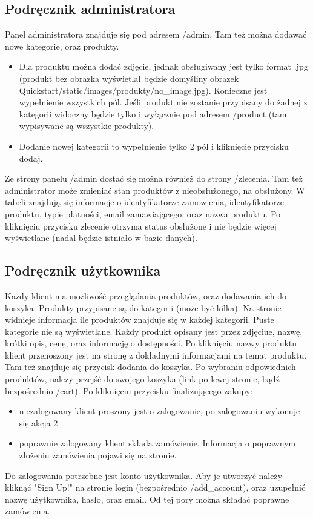 \documentclass[12pt]{article}
\begin{document}
  \subsection{Podręcznik administratora}
	Panel administratora znajduje się pod adresem /admin. Tam też można dodawać nowe kategorie, oraz produkty. 
	\begin {itemize}
		\item  Dla produktu można dodać zdjęcie, jednak obsługiwany jest tylko format .jpg (produkt bez obrazka wyświetlał będzie domyśliny obrazek Quickstart/static/images/produkty/no\_image.jpg). Konieczne jest wypełnienie wszystkich pól. Jeśli produkt nie zostanie przypisany do żadnej z kategorii widoczny będzie tylko i wyłącznie pod adresem /product (tam wypisywane są wszystkie produkty).
		\item Dodanie nowej kategorii to wypełnienie tylko 2 pól i kliknięcie przycisku dodaj.
	\end {itemize}
	Ze strony panelu /admin dostać się można również do strony /zlecenia. Tam też administrator może zmieniać stan produktów z nieobsłużonego, na obsłużony. W tabeli znajdują się informacje o identyfikatorze zamowienia, identyfikatorze produktu, typie płatności, email zamawiającego, oraz nazwa produktu. Po kliknięciu przycisku zlecenie otrzyma status obsłużone i nie będzie więcej wyświetlane (nadal będzie istniało w bazie danych).
  \subsection {Podręcznik użytkownika}
	Każdy klient ma możliwość przeglądania produktów, oraz dodawania ich do koszyka. Produkty przypisane są do kategorii (może być kilka). Na stronie widnieje informacja ile produktów znajduje się w każdej kategorii. Puste kategorie nie są wyświetlane. Każdy produkt opisany jest przez zdjęciue, nazwę, krótki opis, cenę, oraz informację o dostępności. Po kliknięciu nazwy produktu klient przenoszony jest na stronę z dokładnymi informacjami na temat produktu. Tam też znajduje się przycisk dodania do koszyka.
Po wybraniu odpowiednich produktów, należy przejść do swojego koszyka (link po lewej stronie, bądź bezpośrednio /cart). Po kliknięciu przycisku finalizującego zakupy:
	\begin {itemize}
		\item niezalogowany klient proszony jest o zalogowanie, po zalogowaniu wykonuje się akcja 2
		\item poprawnie zalogowany klient składa zamówienie. Informacja o poprawnym złożeniu zamówienia pojawi się na stronie.
	\end {itemize}
	Do zalogowania potrzebne jest konto użytkownika. Aby je utworzyć należy kliknąć "Sign Up!" na stronie login (bezpośrednio /add\_account), oraz uzupełnić nazwę użytkownika, hasło, oraz email. Od tej pory można składać poprawne zamówienia.



\end{document}
